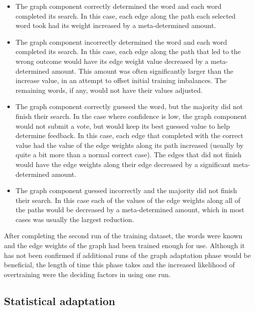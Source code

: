 \begin{itemize}      
	\item The graph component correctly determined the word and each word 
	completed its search.  In this case, each edge along the path each selected 
	word took had its weight increased by a meta-determined amount.
	\item The graph component incorrectly determined the word and each word 
	completed its search. In this case, each edge along the path that led to the 
	wrong outcome would have its edge weight value decreased by a 
	meta-determined amount. This amount was often significantly larger than the 
	increase value, in an attempt to offset initial training imbalances. The 
	remaining words, if any, would not have their values adjusted.     
	\item The graph component correctly guessed the word, but the majority did 
	not finish their search. In the case where confidence is low, the graph 
	component would not submit a vote, but would keep its best guessed value to 
	help determine feedback. In this case, each edge that completed with the 
	correct value had the value of the edge weights along its path increased 
	(usually by quite a bit more than a normal correct case). The edges that did 
	not finish would have the edge weights along their edge decreased by a 
	significant meta-determined amount.     
	\item The graph component guessed incorrectly and the majority did not 
	finish their search. In this case each of the values of the edge weights 
	along all of the paths would be decreased by a meta-determined amount, which 
	in most cases was usually the largest reduction. 
\end{itemize}

After completing the second run of the training dataset, the words were known and
the edge weights of the graph had been trained enough for use.  Although it has
not been confirmed if additional runs of the graph adaptation phase would be
beneficial, the length of time this phase takes and the increased likelihood
of overtraining were the deciding factors in using one run.

\subsection{Statistical adaptation}


